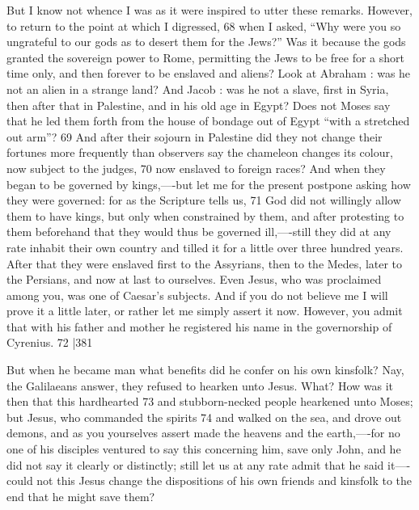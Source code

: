 But I know not whence I was as it were inspired to utter these remarks. However, to return to the point at which I digressed, 68 when I asked, ``Why were you so ungrateful to our gods as to desert them for the Jews?'' Was it because the gods granted the sovereign power to Rome, permitting the Jews to be free for a short time only, and then forever to be enslaved and aliens? Look at Abraham : was he not an alien in a strange land? And Jacob : was he not a slave, first in Syria, then after that in Palestine, and in his old age in Egypt? Does not Moses say that he led them forth from the house of bondage out of Egypt ``with a stretched out arm''?
69 And after their sojourn in Palestine did they not change their fortunes more frequently than observers say the chameleon changes its colour, now subject to the judges, 70 now enslaved to foreign races? And when they began to be governed by kings,----but let me for the present postpone asking how they were governed: for as the Scripture tells us, 71 God did not willingly allow them to have kings, but only when constrained by them, and after protesting to them beforehand that they would thus be governed ill,----still they did at any rate inhabit their own country and tilled it for a little over three hundred years. After that they were enslaved first to the Assyrians, then to the Medes, later to the Persians, and now at last to ourselves. Even Jesus, who was proclaimed among you, was one of Caesar's subjects. And if you do not believe me I will prove it a little later, or rather let me simply assert it now. However, you admit that with his father and mother he registered his name in the governorship of Cyrenius. 72
|381

But when he became man what benefits did he confer on his own kinsfolk? Nay, the Galilaeans answer, they refused to hearken unto Jesus. What? How was it then that this hardhearted
73 and stubborn-necked people hearkened unto Moses; but Jesus, who commanded the spirits
74 and walked on the sea, and drove out demons, and as you yourselves assert made the heavens and the earth,----for no one of his disciples ventured to say this concerning him, save only John, and he did not say it clearly or distinctly; still let us at any rate admit that he said it----could not this Jesus change the dispositions of his own friends and kinsfolk to the end that he might save them?

